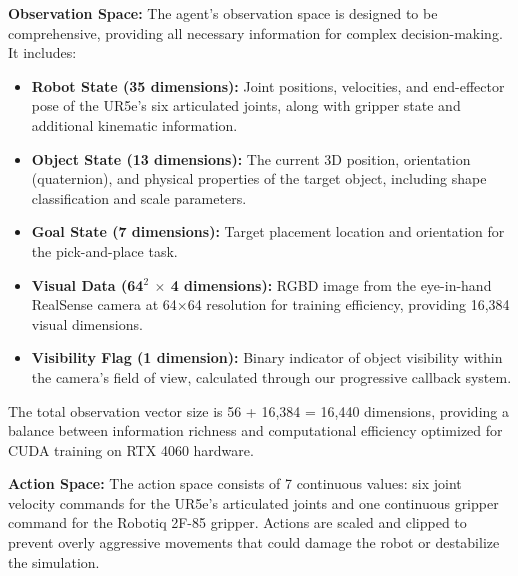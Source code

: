 \documentclass[conference]{IEEEtran}
\begin{document}
\textbf{Observation Space:} The agent's observation space is designed to be comprehensive, providing all necessary information for complex decision-making. It includes:
\begin{itemize}
    \item \textbf{Robot State (35 dimensions):} Joint positions, velocities, and end-effector pose of the UR5e's six articulated joints, along with gripper state and additional kinematic information.
    \item \textbf{Object State (13 dimensions):} The current 3D position, orientation (quaternion), and physical properties of the target object, including shape classification and scale parameters.
    \item \textbf{Goal State (7 dimensions):} Target placement location and orientation for the pick-and-place task.
    \item \textbf{Visual Data (64$^2$ $\times$ 4 dimensions):} RGBD image from the eye-in-hand RealSense camera at 64$\times$64 resolution for training efficiency, providing 16,384 visual dimensions.
    \item \textbf{Visibility Flag (1 dimension):} Binary indicator of object visibility within the camera's field of view, calculated through our progressive callback system.
\end{itemize}
The total observation vector size is 56 + 16,384 = 16,440 dimensions, providing a balance between information richness and computational efficiency optimized for CUDA training on RTX 4060 hardware.

\textbf{Action Space:} The action space consists of 7 continuous values: six joint velocity commands for the UR5e's articulated joints and one continuous gripper command for the Robotiq 2F-85 gripper. Actions are scaled and clipped to prevent overly aggressive movements that could damage the robot or destabilize the simulation.
\end{document}
